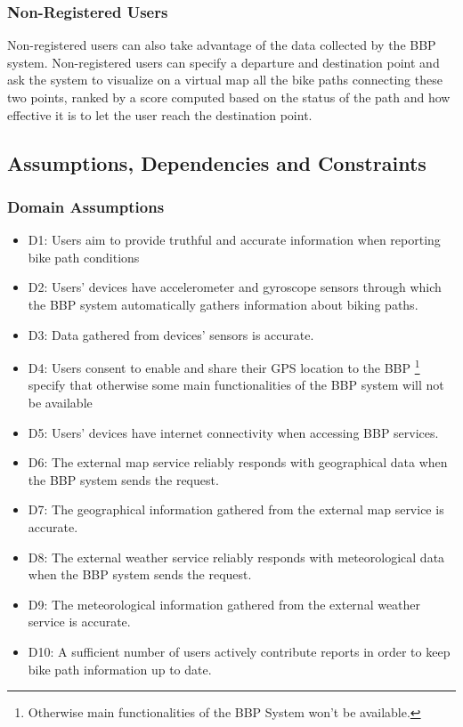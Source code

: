 \subsubsection{Non-Registered Users}
Non-registered users can also take advantage of the data collected by the BBP system. Non-registered users can specify a departure and destination point and ask the system to visualize on a virtual map all the bike paths connecting these two points, ranked by a score computed based on the status of the path and how effective it is to let the user reach the destination point.

\subsection{Assumptions, Dependencies and Constraints}

\subsubsection{Domain Assumptions}
\begin{itemize}
    \item D1: Users aim to provide truthful and accurate information when reporting bike path conditions
    \item D2: Users’ devices have accelerometer and gyroscope sensors through which the BBP system automatically gathers information about biking paths.
    \item D3: Data gathered from devices’ sensors is accurate.
    \item D4: Users consent to enable and share their GPS location to the BBP \footnote{Otherwise main functionalities of the BBP System won't be available.} specify that otherwise some main functionalities of the BBP system will not be available 
    \item D5: Users’ devices have internet connectivity when accessing BBP services.
    \item D6: The external map service reliably responds with geographical data when the BBP system sends the request.
    \item D7: The geographical information gathered from the external map service is accurate.
    \item D8: The external weather service reliably responds with meteorological data when the BBP system sends the request.
    \item D9: The meteorological information gathered from the external weather service is accurate.
    \item D10: A sufficient number of users actively contribute reports in order to keep bike path information up to date.
\end{itemize}

